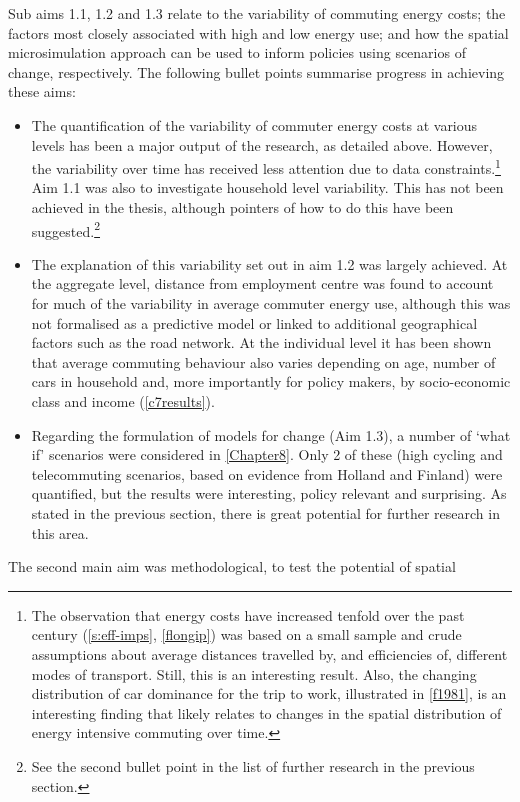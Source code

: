 \documentclass[a4paper, 11pt, twoside]{Thesis}
\begin{document}
Sub aims 1.1, 1.2 and 1.3 relate to the variability of commuting energy costs;
the factors most closely associated with high and low energy use; and how the
spatial microsimulation approach can be used to inform policies using scenarios
of change, respectively. The following bullet points summarise
progress in achieving these aims:
\begin{itemize}
 \item The quantification of the variability of commuter energy costs at various
levels has been a major output of the research, as detailed above. However, the
variability over time has received less attention due to data
constraints.\footnote{The
observation that energy costs have increased tenfold
over the past century (\cref{s:eff-imps}, \cref{flongip}) was based on a small
sample and crude assumptions about average distances travelled by, and
efficiencies of, different modes of transport. Still, this is an interesting
result. Also, the changing distribution of car dominance for the trip to work,
illustrated in \cref{f1981}, is an interesting finding that likely relates to
changes in the spatial distribution of energy
intensive commuting over time.
}
Aim 1.1 was also to investigate household level variability. This has not been
achieved in the thesis, although pointers of how to do this have been
suggested.\footnote{See
the second bullet point in the list of further research
in the previous section.
}
\item The explanation of this variability set out in aim 1.2 was largely
achieved. At the aggregate level, distance from employment centre was found to
account for much of the variability in average commuter energy use, although
this was not formalised as a predictive model or linked to additional
geographical factors such as the road network. At the individual level it has
been shown that average commuting behaviour also varies depending on age,
number of cars in household and, more importantly for policy makers, by
socio-economic class and income (\cref{c7results}).
\item Regarding the formulation of models for change (Aim 1.3), a number of
`what if' scenarios were considered in \cref{Chapter8}. Only 2 of
these (high cycling and telecommuting scenarios, based on evidence from Holland
and Finland) were quantified, but the results were interesting, policy relevant
and surprising. As stated in the previous section, there is great potential for
further research in this area.
\end{itemize}
The second main aim was methodological, to test the potential of spatial
\end{document}
